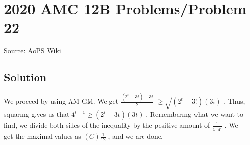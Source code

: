 \documentclass[12pt]{article}
\begin{document}
\section*{{2020 AMC 12B Problems/Problem 22}}
Source: AoPS Wiki

\subsection*{Solution}
We proceed by using AM-GM. We get $\frac{(2^t-3t) + 3t}{2}$ $\ge \sqrt{(2^t-3t)(3t)}$ . Thus, squaring gives us that $4^{t-1} \ge (2^t-3t)(3t)$ . Remembering what we want to find, we divide both sides of the inequality by the positive amount of $\frac{1}{3\cdot4^t}$ . We get the maximal values as $\boxed{(C) \frac{1}{12}}$ , and we are done.
\end{document}
